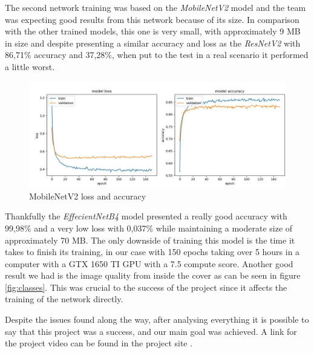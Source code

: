 \documentclass[a4paper,11pt]{article}
\begin{document}
The second network training was based on the \textit{MobileNetV2} model and the team was expecting good results from this network because of its size. In comparison with the other trained models, this one is very small, with approximately 9 MB in size and despite presenting a similar accuracy and loss as the \textit{ResNetV2} with 86,71\% accuracy and 37,28\%, when put to the test in a real scenario it performed a little worst.

\begin{figure}[H]
  \centering
  \includegraphics[width=12cm]{Figures/MobileNetV2_Loss_Acc.jpg}
  \caption{\small{MobileNetV2 loss and accuracy}}
  \label{fig:mobilenet}
\end{figure}

Thankfully the \textit{EffecientNetB4} model presented a really good accuracy with 99,98\% and a very low loss with 0,037\% while maintaining a moderate size of approximately 70 MB. The only downside of training this model is the time it takes to finish its training, in our case with 150 epochs taking over 5 hours in a computer with a GTX 1650 TI GPU with a 7.5 compute score. Another good result we had is the image quality from inside the cover as can be seen in figure \ref{fig:classes}. This was crucial to the success of the project since it affects the training of the network directly.

Despite the issues found along the way, after analysing everything it is possible to say that this project was a success, and our main goal was achieved. A link for the project video can be found in the project site \cite{blog}.




\end{document}
